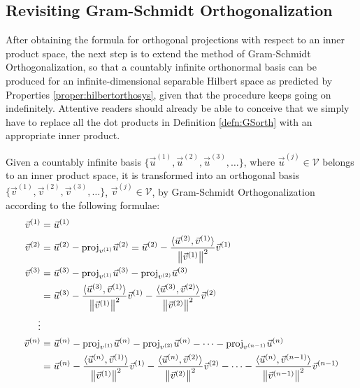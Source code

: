 \subsection{Revisiting Gram-Schmidt Orthogonalization}
\label{section:GSorthinnersec}

After obtaining the formula for orthogonal projections with respect to an inner product space, the next step is to extend the method of Gram-Schmidt Orthogonalization, so that a countably infinite orthonormal basis can be produced for an infinite-dimensional separable Hilbert space as predicted by Properties \ref{proper:hilbertorthosys}, given that the procedure keeps going on indefinitely. Attentive readers should already be able to conceive that we simply have to replace all the dot products in Definition \ref{defn:GSorth} with an appropriate inner product. 
\begin{defn}
\label{defn:GSorthinner}
Given a countably infinite basis $\{\vec{u}^{(1)}, \vec{u}^{(2)}, \vec{u}^{(3)}, \ldots\}$, where $\vec{u}^{(j)} \in \mathcal{V}$ belongs to an inner product space, it is transformed into an orthogonal basis $\{\vec{v}^{(1)}, \vec{v}^{(2)}, \vec{v}^{(3)}, \ldots\}$, $\vec{v}^{(j)} \in \mathcal{V}$, by Gram-Schmidt Orthogonalization according to the following formulae:
\begin{align}
\vec{v}^{(1)} &= \vec{u}^{(1)} \nonumber\\
\vec{v}^{(2)} &= \vec{u}^{(2)} - \text{proj}_{v^{(1)}}\vec{u}^{(2)} = \vec{u}^{(2)} - \frac{\langle \vec{u}^{(2)}, \vec{v}^{(1)}\rangle}{\norm{\vec{v}^{(1)}}^2} \vec{v}^{(1)} \nonumber \\
\vec{v}^{(3)} &= \vec{u}^{(3)} - \text{proj}_{v^{(1)}}\vec{u}^{(3)} - \text{proj}_{v^{(2)}}\vec{u}^{(3)} \nonumber\\
&= \vec{u}^{(3)} - \frac{\langle\vec{u}^{(3)}, \vec{v}^{(1)}\rangle}{\norm{\vec{v}^{(1)}}^2} \vec{v}^{(1)} - \frac{\langle\vec{u}^{(3)}, \vec{v}^{(2)}\rangle}{\norm{\vec{v}^{(2)}}^2} \vec{v}^{(2)} \\
\vdots \nonumber \\
\vec{v}^{(n)} &= \vec{u}^{(n)} - \text{proj}_{v^{(1)}}\vec{u}^{(n)} - \text{proj}_{v^{(2)}}\vec{u}^{(n)} - \cdots - \text{proj}_{v^{(n-1)}}\vec{u}^{(n)} \nonumber \\
&= \vec{u}^{(n)} - \frac{\langle\vec{u}^{(n)}, \vec{v}^{(1)}\rangle}{\norm{\vec{v}^{(1)}}^2} \vec{v}^{(1)} - \frac{\langle\vec{u}^{(n)}, \vec{v}^{(2)}\rangle}{\norm{\vec{v}^{(2)}}^2} \vec{v}^{(2)} - \cdots - \frac{\langle\vec{u}^{(n)}, \vec{v}^{(n-1)}\rangle}{\norm{\vec{v}^{(n-1)}}^2} \vec{v}^{(n-1)} \nonumber

\end{align}
\end{defn}

